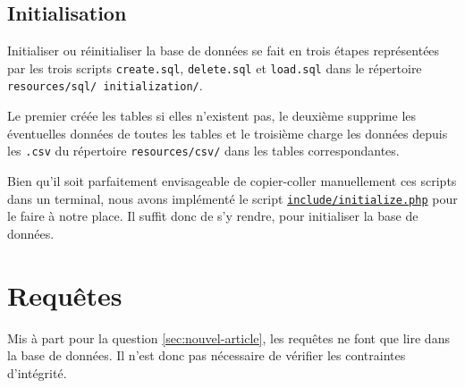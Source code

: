 \documentclass[a4paper, 12pt]{article}
\begin{document}
	\subsection{Initialisation}
    Initialiser ou réinitialiser la base de données se fait en trois étapes représentées par les trois scripts \texttt{create.sql}, \texttt{delete.sql} et \texttt{load.sql} dans le répertoire \texttt{resources/sql/ initialization/}. \par
    Le premier créée les tables si elles n'existent pas, le deuxième supprime les éventuelles données de toutes les tables et le troisième charge les données depuis les \texttt{.csv} du répertoire \texttt{resources/csv/} dans les tables correspondantes. \par
    Bien qu'il soit parfaitement envisageable de copier-coller manuellement ces scripts dans un terminal, nous avons implémenté le script \href{http://www.student.montefiore.ulg.ac.be/~s161024/include/initialize.php}{\texttt{include/initialize.php}} pour le faire à notre place. Il suffit donc de s'y rendre, pour initialiser la base de données.
    \section{Requêtes}
    Mis à part pour la question \ref{sec:nouvel-article}, les requêtes ne font que lire dans la base de données. Il n'est donc pas nécessaire de vérifier les contraintes d'intégrité.
    \renewcommand\thesubsection{\thesection.\alph{subsection}}
\end{document}
